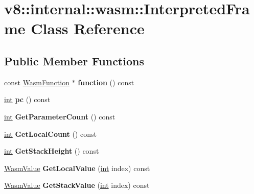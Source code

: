 \hypertarget{classv8_1_1internal_1_1wasm_1_1InterpretedFrame}{}\section{v8\+:\+:internal\+:\+:wasm\+:\+:Interpreted\+Frame Class Reference}
\label{classv8_1_1internal_1_1wasm_1_1InterpretedFrame}
\subsection*{Public Member Functions}
\begin{DoxyCompactItemize}
\item 
\mbox{\label{classv8_1_1internal_1_1wasm_1_1InterpretedFrame_a92e8794ddc506b836804d2b361b90b79}} 
const \mbox{\hyperlink{structv8_1_1internal_1_1wasm_1_1WasmFunction}{Wasm\+Function}} $\ast$ {\bfseries function} () const
\item 
\mbox{\label{classv8_1_1internal_1_1wasm_1_1InterpretedFrame_a50131e39a6670e20c81361c8317a877e}} 
\mbox{\hyperlink{classint}{int}} {\bfseries pc} () const
\item 
\mbox{\label{classv8_1_1internal_1_1wasm_1_1InterpretedFrame_ab1265210faaa0ca5b16a7dfdc3c39cb9}} 
\mbox{\hyperlink{classint}{int}} {\bfseries Get\+Parameter\+Count} () const
\item 
\mbox{\label{classv8_1_1internal_1_1wasm_1_1InterpretedFrame_a464e3d2d625e2ddae83141147394be95}} 
\mbox{\hyperlink{classint}{int}} {\bfseries Get\+Local\+Count} () const
\item 
\mbox{\label{classv8_1_1internal_1_1wasm_1_1InterpretedFrame_a2c8c2ffc9c5e60b05e190557ffcebde8}} 
\mbox{\hyperlink{classint}{int}} {\bfseries Get\+Stack\+Height} () const
\item 
\mbox{\label{classv8_1_1internal_1_1wasm_1_1InterpretedFrame_a78fb9abd0bf0cedaabc531239be4ab2a}} 
\mbox{\hyperlink{classv8_1_1internal_1_1wasm_1_1WasmValue}{Wasm\+Value}} {\bfseries Get\+Local\+Value} (\mbox{\hyperlink{classint}{int}} index) const
\item 
\mbox{\label{classv8_1_1internal_1_1wasm_1_1InterpretedFrame_aac8667ade2c64d8e48b4495134a42980}} 
\mbox{\hyperlink{classv8_1_1internal_1_1wasm_1_1WasmValue}{Wasm\+Value}} {\bfseries Get\+Stack\+Value} (\mbox{\hyperlink{classint}{int}} index) const
\end{DoxyCompactItemize}
